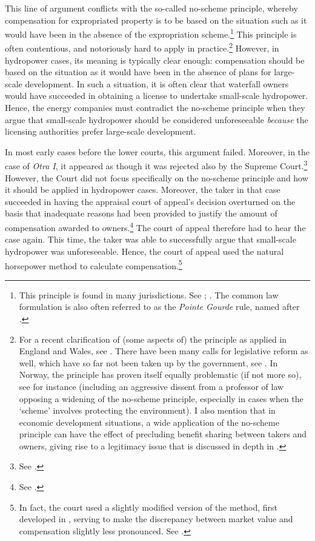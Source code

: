 This line of argument conflicts with the so-called no-scheme principle, whereby compensation for expropriated property is to be based on the situation such as it would have been in the absence of the expropriation scheme.\footnote{This principle is found in many jurisdictions. See \cite[20-21]{sluysmans15}; \cite[1722]{lehavi07}. The common law formulation is also often referred to as the {\it Pointe Gourde} rule, named after \cite{gourde47}.} This principle is often contentious, and notoriously hard to apply in practice.\footnote{For a recent clarification of (some aspects of) the principle as applied in England and Wales, see \cite{waters04,spirerose09}. There have been many calls for legislative reform as well, which have so far not been taken up by the government, see \cite[152]{waring15}. In Norway, the principle has proven itself equally problematic (if not more so), see for instance \cite{nou03} (including an aggressive dissent from a professor of law opposing a widening of the no-scheme principle, especially in cases when the `scheme' involves protecting the environment). I also mention that in economic development situations, a wide application of the no-scheme principle can have the effect of precluding benefit sharing between takers and owners, giving rise to a legitimacy issue that is discussed in depth in \cite{dyrkolbotn15a}.} However, in hydropower cases, its meaning is typically clear enough: compensation should be based on the situation as it would have been in the absence of plans for large-scale development. In such a situation, it is often clear that waterfall owners would have succeeded in obtaining a license to undertake small-scale hydropower. Hence, the energy companies must contradict the no-scheme principle when they argue that small-scale hydropower should be considered unforeseeable {\it because} the licensing authorities prefer large-scale development.

In most early cases before the lower courts, this argument failed. Moreover, in the case of {\it Otra I}, it appeared as though it was rejected also by the Supreme Court.\footnote{See \cite[31-48]{otra10}.} However, the Court did not focus specifically on the no-scheme principle and how it should be applied in hydropower cases. Moreover, the taker in that case succeeded in having the appraisal court of appeal's decision overturned on the basis that inadequate reasons had been provided to justify the amount of compensation awarded to owners.\footnote{See \cite[52]{otra10}.} The court of appeal therefore had to hear the case again. This time, the taker was able to successfully argue that small-scale hydropower was unforeseeable. Hence, the court of appeal used the natural horsepower method to calculate compensation.\footnote{In fact, the court used a slightly modified version of the method, first developed in \cite{sauda09}, serving to make the discrepancy between market value and compensation slightly less pronounced. See \cite{otra12}.} 

